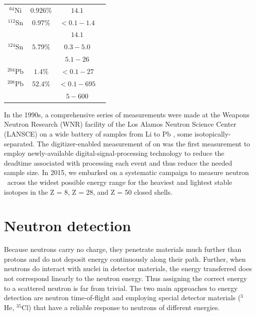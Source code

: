 \begin{table}[ht]
\begin{center}
\begin{tabular}{ c c c c }
            $^{64}$Ni & $0.926\%$ & $14.1$ & \cite{Dukarevich1967}\\

            $^{112}$Sn & $0.97\%$ & $<0.1-1.4$ & \cite{Timokhov1989}\\
            & & $14.1$ & \cite{Dukarevich1967}\\

            $^{124}$Sn & $5.79\%$ & $0.3-5.0$ & \cite{Harper1982}\\
            & & $5.1-26$ & \cite{Rapaport1980}\\

            $^{204}$Pb & $1.4\%$ & $<0.1-27$ & \cite{Carlton2003}\\

            $^{208}$Pb & $52.4\%$ & $<0.1 - 695$ & \cite{Harvey1999}\\
            & & $5-600$ & \cite{Finlay1993}\\

            \hline
        \end{tabular}
    \end{center}
\end{table}

In the 1990s, a comprehensive series of measurements were made at the Weapons Neutron Research (WNR)
facility of the Los Alamos Neutron Science Center (LANSCE) on a wide battery of samples from Li to
Pb \cite{Finlay1993, Abfalterer2001}, some isotopically-separated. The digitizer-enabled measurement
of \cite{Shane2010} on \caAughtEight was the first measurement
to employ newly-available digital-signal-processing technology to reduce the deadtime associated
with processing each event and thus reduce the needed sample size. In 2015, we
embarked on a systematic campaign to measure neutron \tot\ across the widest possible energy range
for the heaviest and lightest stable isotopes in the Z = 8, Z = 28, and Z = 50 closed shells.


\section{Neutron detection}
Because neutrons carry no charge, they penetrate materials much further than protons and do not
deposit energy continuously along their path. Further, when neutrons do interact with nuclei in
detector materials, the energy transferred does not correspond linearly to the neutron energy. Thus
assigning the correct energy to a scattered neutron is far from trivial. The two main approaches to
energy detection are neutron time-of-flight and employing special detector materials ($^{3}$He,
$^{35}$Cl) that have a reliable response to neutrons of different energies.

